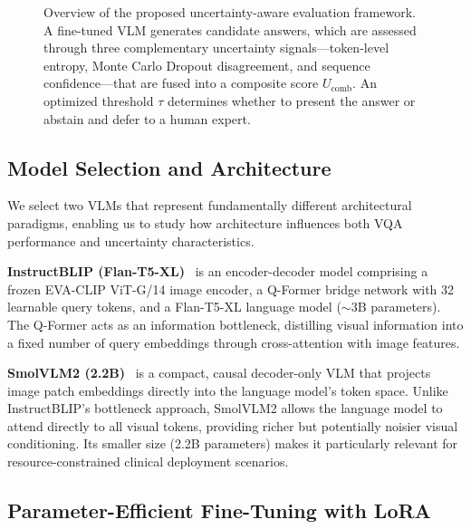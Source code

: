 \documentclass[pdflatex,sn-mathphys-num]{sn-jnl}
\begin{document}
\begin{figure}[t]
{
}%
\caption{Overview of the proposed uncertainty-aware evaluation framework. A fine-tuned VLM generates candidate answers, which are assessed through three complementary uncertainty signals---token-level entropy, Monte Carlo Dropout disagreement, and sequence confidence---that are fused into a composite score $U_{\text{comb}}$. An optimized threshold $\tau$ determines whether to present the answer or abstain and defer to a human expert.}\label{fig:pipeline}
\end{figure}

\subsection{Model Selection and Architecture}

We select two VLMs that represent fundamentally different architectural paradigms, enabling us to study how architecture influences both VQA performance and uncertainty characteristics.

\textbf{InstructBLIP (Flan-T5-XL)}~\cite{dai2023instructblip} is an encoder-decoder model comprising a frozen EVA-CLIP ViT-G/14 image encoder, a Q-Former bridge network with 32 learnable query tokens, and a Flan-T5-XL language model ($\sim$3B parameters). The Q-Former acts as an information bottleneck, distilling visual information into a fixed number of query embeddings through cross-attention with image features.

\textbf{SmolVLM2 (2.2B)}~\cite{allal2025smolvlm} is a compact, causal decoder-only VLM that projects image patch embeddings directly into the language model's token space. Unlike InstructBLIP's bottleneck approach, SmolVLM2 allows the language model to attend directly to all visual tokens, providing richer but potentially noisier visual conditioning. Its smaller size (2.2B parameters) makes it particularly relevant for resource-constrained clinical deployment scenarios.

\subsection{Parameter-Efficient Fine-Tuning with LoRA}\label{subsec:lora}
\end{document}
